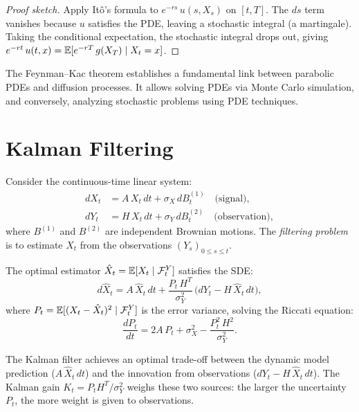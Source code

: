 \begin{proof}[Proof sketch]
Apply It\^o's formula to $e^{-rs}\,u(s,X_s)$ on $[t,T]$. The $ds$ term
vanishes because $u$ satisfies the PDE, leaving a stochastic integral
(a martingale). Taking the conditional expectation, the stochastic
integral drops out, giving
$e^{-rt}\,u(t,x) = \mathbb{E}[e^{-rT}\,g(X_T) \mid X_t = x]$.
\end{proof}

\begin{remark}
The Feynman--Kac theorem establishes a fundamental link between
parabolic PDEs and diffusion processes. It allows solving PDEs via Monte
Carlo simulation, and conversely, analyzing stochastic problems using
PDE techniques.
\end{remark}

\section{Kalman Filtering}
\label{sec:kalman}

\begin{definition}
Consider the continuous-time linear system:
\begin{align*}
  dX_t &= A\,X_t\,dt + \sigma_X\,dB_t^{(1)} \quad \text{(signal)}, \\
  dY_t &= H\,X_t\,dt + \sigma_Y\,dB_t^{(2)} \quad \text{(observation)},
\end{align*}
where $B^{(1)}$ and $B^{(2)}$ are independent Brownian motions.
The \emph{filtering problem} is to estimate $X_t$ from the observations
$(Y_s)_{0 \leq s \leq t}$.
\end{definition}

\begin{theorem}
\label{thm:kalman_bucy}
The optimal estimator $\hat{X}_t = \mathbb{E}[X_t \mid \mathcal{F}_t^Y]$
satisfies the SDE:
\[
  d\hat{X}_t = A\,\hat{X}_t\,dt
    + \frac{P_t\,H^T}{\sigma_Y^2}\,\bigl(dY_t - H\,\hat{X}_t\,dt\bigr),
\]
where $P_t = \mathbb{E}[(X_t - \hat{X}_t)^2 \mid \mathcal{F}_t^Y]$ is the
error variance, solving the Riccati equation:
\[
  \frac{dP_t}{dt} = 2A\,P_t + \sigma_X^2 - \frac{P_t^2\,H^2}{\sigma_Y^2}.
\]
\end{theorem}

\begin{intuition}
The Kalman filter achieves an optimal trade-off between the dynamic
model prediction ($A\,\hat{X}_t\,dt$) and the innovation from
observations ($dY_t - H\,\hat{X}_t\,dt$). The Kalman gain
$K_t = P_t H^T/\sigma_Y^2$ weighs these two sources: the larger the
uncertainty $P_t$, the more weight is given to observations.
\end{intuition}


